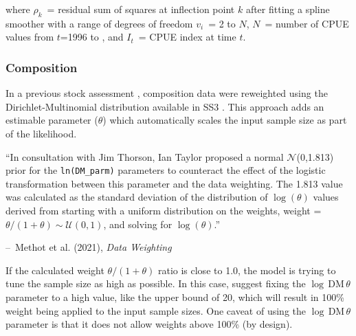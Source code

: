 \documentclass[11pt]{book}
\makeatletter
\newcommand{\Norm}{\mathcal{N}}%
\newcommand{\pc}{\%}
\newcommand{\ptype}{png}
\newenvironment{chapquote}[2][2em]
  {\setlength{\@tempdima}{#1}%
   \def\chapquote@author{#2}%
   \parshape 1 \@tempdima \dimexpr\textwidth-2\@tempdima\relax%
   \small\color{colquote}}
  {\par\normalfont\hfill--\ \chapquote@author\hspace*{\@tempdima}\par\smallskip}
\newcommand\onefigWH[4]{
  \begin{figure}[tp]
  \begin{center}
  \pdftooltip{
  \texttt{[image: \{\#1]}.\ptype}}{Figure~\ref{fig:#1}}
  \end{center}
  \caption{#2}
  \label{fig:#1}
  \end{figure}
}
\makeatother
\begin{document}
where $\rho_k$~= residual sum of squares at inflection point $k$ after fitting a spline smoother with a range of degrees of freedom $v_i$~= 2 to $N$, $N$~= number of CPUE values from $t$=1996 to \prevYear, and $I_t$~= CPUE index at time $t$.



\subsubsection{Composition} \label{sss:rwt_abund}

In a previous stock assessment \citep{Starr-Haigh:2023_car}, composition data were reweighted using the Dirichlet-Multinomial distribution available in SS3 \citep{Thorson-etal:2017}. 
This approach adds an estimable parameter ($\theta$) which automatically scales the input sample size as part of the likelihood.

\begin{chapquote}{Methot et al. (2021), \textit{Data Weighting}}
``In consultation with Jim Thorson, Ian Taylor proposed a normal $\Norm$(0,1.813) prior for
the \texttt{ln(DM\_parm)} parameters to counteract the effect of the logistic 
transformation between this parameter and the data weighting. The 1.813 value was
calculated as the standard deviation of the distribution of $\log(\theta)$ values derived from
starting with a uniform distribution on the weights, weight = $\theta/(1 + \theta) \sim \mathcal{U}(0,1)$,
and solving for $\log(\theta)$.''

\end{chapquote}

If the calculated weight $\theta/(1 + \theta)$ ratio is close to 1.0, the model is trying to tune the sample size as high as possible.
In this case, \citet{Methot-etal:2021} suggest fixing the $\log\,\text{DM}\,\theta$ parameter to a high value, like the upper bound of 20, which will result in 100\pc{} weight being applied to the input sample sizes.
One caveat of using the $\log\,\text{DM}\,\theta$ parameter is that it does not allow weights above 100\pc{} (by design).
\end{document}
